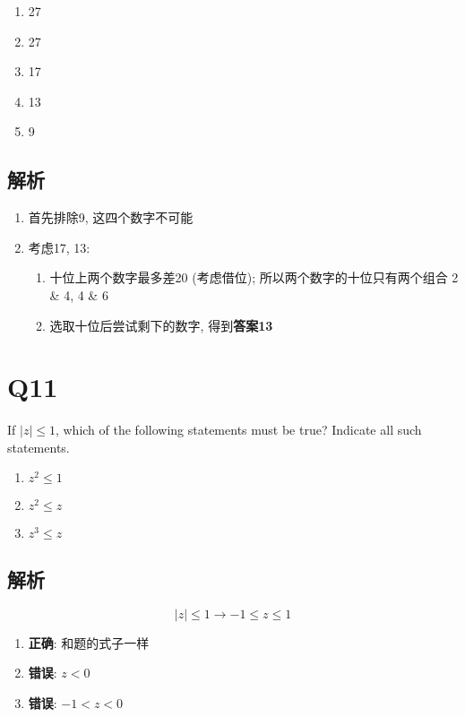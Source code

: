   \begin{enumerate}
    \item 27
    \item 27
    \item 17
    \item 13
    \item 9
  \end{enumerate}

  \subsection{解析}

    \begin{enumerate}
      \item 首先排除9, 这四个数字不可能
      \item 考虑17, 13:
      \begin{enumerate}
        \item 十位上两个数字最多差20 (考虑借位); 所以两个数字的十位只有两个组合
        2 \& 4, 4 \& 6
        \item 选取十位后尝试剩下的数字, 得到\textbf{答案13}
      \end{enumerate}
    \end{enumerate}

\section{Q11}

  If $ \left| z \right| \le 1 $, which of the following statements must be
  true? Indicate all such statements.

  \begin{enumerate}
    \item $ z^{2} \le 1 $
    \item $ z^{2} \le z $
    \item $ z^{3} \le z $
  \end{enumerate}

  \subsection{解析}

    \begin{equation*}
      \left| z \right| \le 1 \to -1 \le z \le 1
    \end{equation*}

    \begin{enumerate}
      \item \textbf{正确}: 和题的式子一样
      \item \textbf{错误}: $ z < 0 $
      \item \textbf{错误}: $ -1 < z < 0 $
    \end{enumerate}
